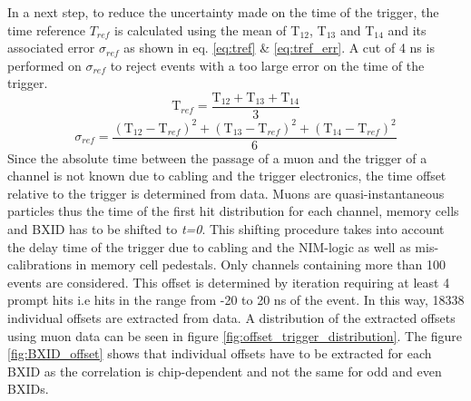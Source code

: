 \documentclass[twoside,a4paper,11pt]{article}
\begin{document}
In a next step, to reduce the uncertainty made on the time of the trigger, the time reference $T_{ref}$ is calculated using the mean of T$_{12}$, T$_{13}$ and T$_{14}$ and its associated error $\sigma_{ref}$ as shown in eq. \ref{eq:tref} \& \ref{eq:tref_err}. A cut of 4 ns is performed on $\sigma_{ref}$ to reject events with a too large error on the time of the trigger.
\begin{equation} \label{eq:tref}
\text{T}_{ref} = \frac{\text{T}_{12} + \text{T}_{13} + \text{T}_{14}}{3}
\end{equation}
\begin{equation} \label{eq:tref_err}
\sigma_{ref} = \frac{ (\text{T}_{12} - \text{T}_{ref})^2 + (\text{T}_{13} - \text{T}_{ref})^2  + (\text{T}_{14} - \text{T}_{ref})^2 }{6}
\end{equation}
Since the absolute time between the passage of a muon and the trigger of a channel is not known due to cabling and the trigger electronics, the time offset relative to the trigger is determined from data. Muons are quasi-instantaneous particles thus the time of the first hit distribution for each channel, memory cells and BXID has to be shifted to \textit{t=0}. This shifting procedure takes into account the delay time of the trigger due to cabling and the NIM-logic as well as mis-calibrations in memory cell pedestals. Only channels containing more than 100 events are considered. This offset is determined by iteration requiring at least 4 prompt hits i.e hits in the range from -20 to 20 ns of the event. In this way, 18338 individual offsets are extracted from data. A distribution of the extracted offsets using muon data can be seen in figure \ref{fig:offset_trigger_distribution}. The figure \ref{fig:BXID_offset} shows that individual offsets have to be extracted for each BXID as the correlation is chip-dependent and not the same for odd and even BXIDs.
\end{document}
